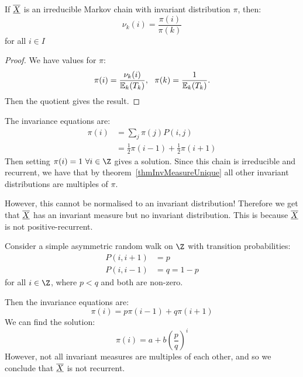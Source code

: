 \documentclass[../Main.tex]{subfiles}
\begin{document}
\begin{corollary}
    If $\underline{\overline{X}}$ is an irreducible Markov chain with invariant distribution $\pi$, then:
    \begin{equation*}
        \nu_k(i) = \frac{\pi(i)}{\pi(k)}
    \end{equation*}
    for all $i \in I$
    \label{corInvariantQuotient}
\end{corollary}
\begin{proof}
    We have values for $\pi$:
    \begin{equation*}
        \pi(i) = \frac{\nu_k(i)}{\mathbb{E}_k(T_k)},~~\pi(k) = \frac{1}{\mathbb{E}_k(T_k)}.
    \end{equation*}
    Then the quotient gives the result.
\end{proof}
\begin{example}
    The invariance equations are:
    \begin{align*}
        \pi(i) &= \sum_j \pi(j) P(i, j) \\
        &= \frac12 \pi(i-1) + \frac12 \pi(i + 1)
    \end{align*}
    Then setting $\pi(i) = 1~\forall i \in \Z$ gives a solution. Since this chain is irreducible and recurrent, we have that by theorem~\ref{thmInvMeasureUnique} all other invariant distributions are multiples of $\pi$.

    However, this cannot be normalised to an invariant distribution! Therefore we get that $\underline{\overline{X}}$ has an invariant measure but no invariant distribution. This is because $\underline{\overline{X}}$ is not positive-recurrent.
\end{example}
\begin{example}
    Consider a simple asymmetric random walk on $\Z$ with transition probabilities:
    \begin{align*}
        P(i, i+1) &= p\\
        P(i, i-1) &= q = 1-p
    \end{align*}
    for all $i \in \Z$, where $p < q$ and both are non-zero.

    Then the invariance equations are:
    \begin{equation*}
        \pi(i) = p \pi(i-1) + q \pi(i + 1)
    \end{equation*}
    We can find the solution:
    \begin{equation*}
        \pi(i) = a + b \left(\frac{p}{q}\right)^i
    \end{equation*}
    However, not all invariant measures are multiples of each other, and so we conclude that $\underline{\overline{X}}$ is not recurrent.
\end{example}
\end{document}

